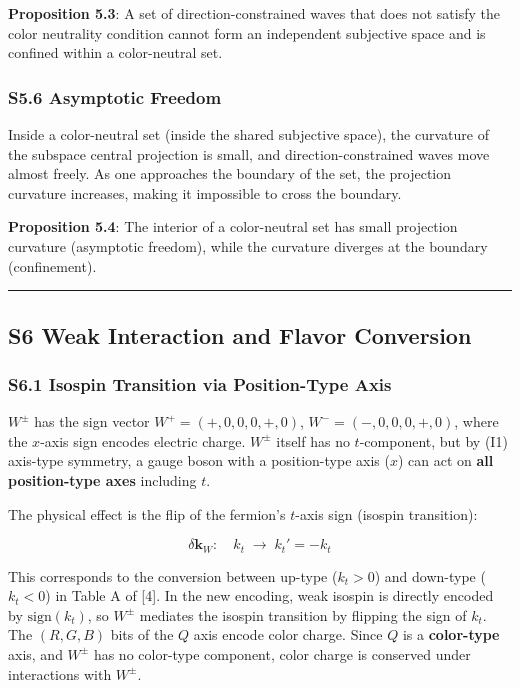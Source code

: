 \documentclass[
  a4paper,11pt]{article}
\theoremstyle{definition}
\theoremstyle{remark}
\begin{document}
\textbf{Proposition 5.3}: A set of direction-constrained waves that does
not satisfy the color neutrality condition cannot form an independent
subjective space and is confined within a color-neutral set.

\subsubsection{S5.6 Asymptotic Freedom}\label{s5.6-asymptotic-freedom}

Inside a color-neutral set (inside the shared subjective space), the
curvature of the subspace central projection is small, and
direction-constrained waves move almost freely. As one approaches the
boundary of the set, the projection curvature increases, making it
impossible to cross the boundary.

\textbf{Proposition 5.4}: The interior of a color-neutral set has small
projection curvature (asymptotic freedom), while the curvature diverges
at the boundary (confinement).

\begin{center}\rule{0.5\linewidth}{0.5pt}\end{center}

\subsection{S6 Weak Interaction and Flavor
Conversion}\label{s6-weak-interaction-and-flavor-conversion}

\subsubsection{S6.1 Isospin Transition via Position-Type
Axis}\label{s6.1-isospin-transition-via-position-type-axis}

\(W^{\pm}\) has the sign vector \(W^+ = (+, 0, 0, 0, +, 0)\),
\(W^- = (-, 0, 0, 0, +, 0)\), where the \(x\)-axis sign encodes electric
charge. \(W^{\pm}\) itself has no \(t\)-component, but by (I1) axis-type
symmetry, a gauge boson with a position-type axis (\(x\)) can act on
\textbf{all position-type axes} including \(t\).

The physical effect is the flip of the fermion's \(t\)-axis sign
(isospin transition):

\[\delta\mathbf{k}_W: \quad k_t \;\longrightarrow\; k_t' = -k_t\]

This corresponds to the conversion between up-type (\(k_t > 0\)) and
down-type (\(k_t < 0\)) in Table A of {[}4{]}. In the new encoding, weak
isospin is directly encoded by \(\mathrm{sign}(k_t)\), so \(W^{\pm}\)
mediates the isospin transition by flipping the sign of \(k_t\). The
\((R, G, B)\) bits of the \(Q\) axis encode color charge. Since \(Q\) is
a \textbf{color-type} axis, and \(W^{\pm}\) has no color-type component,
color charge is conserved under interactions with \(W^{\pm}\).
\end{document}
